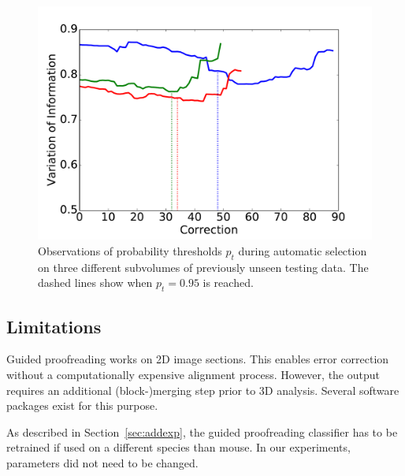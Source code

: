 \begin{figure}[t]
\centering
\includegraphics[width=\linewidth]{gfx/ptplot.pdf}
\caption{Observations of probability thresholds $p_t$ during automatic selection on three different subvolumes of previously unseen testing data. The dashed lines show when $p_t=0.95$ is reached.}
\label{fig:cylboxplot}
\end{figure}

\subsection{Limitations}
Guided proofreading works on 2D image sections. This enables error correction without a computationally expensive alignment process. However, the output requires an additional (block-)merging step prior to 3D analysis. Several software packages exist for this purpose.

As described in Section~\ref{sec:addexp}, the guided proofreading classifier has to be retrained if used on a different species than mouse. In our experiments, parameters did not need to be changed.

